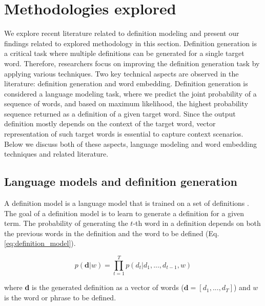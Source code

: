 \section{Methodologies explored}
We explore recent literature related to definition modeling and present our
findings related to explored methodology in this section. Definition generation
is a critical task where multiple definitions can be generated for a single
target word. Therefore, researchers focus on improving the definition generation
task by applying various techniques. Two key technical aspects are observed in
the literature: definition generation and word embedding. Definition generation
is considered a language modeling task, where we predict the joint probability
of a  sequence of words, and based on maximum likelihood, the highest
probability sequence returned as a definition of a given target word. Since the
output definition mostly depends on the context of the target word, vector
representation of such target words is essential to capture context scenarios.
Below we discuss both of these aspects, language modeling and word embedding
techniques and related literature.

\subsection{Language models and definition generation}
A definition model is a language model that is trained on a set of definitions
\cite{noraset_definition_2016}. The goal of a definition model is to learn to
generate a definition for a given term. The probability of generating the $t$-th
word in a definition depends on both the previous words in the definition and
the word to be defined (Eq. \ref{eq:definition_model}).

\begin{equation}
    \label{eq:definition_model}
    p(\textbf{d} | w) = \prod_{t=1}^{T} p(d_t | d_1,...,d_{t-1}, w)
\end{equation}

\noindent
where \textbf{d} is the generated definition as a vector of words ($\textbf{d} =
    [d_1, ..., d_T]$) and $w$ is the word or phrase to be defined.

